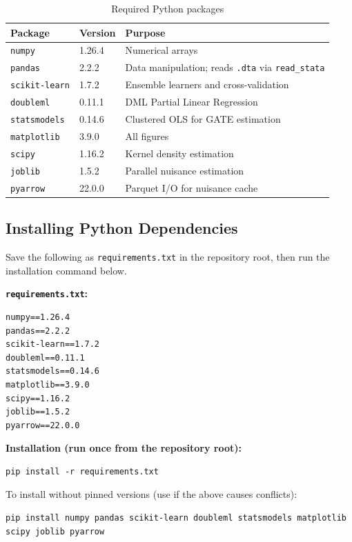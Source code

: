 \documentclass[11pt]{article}
\begin{document}
\begin{table}[h!]
\centering
\caption{Required Python packages}
\label{tab:python-packages}
\begin{tabular}{@{}lll@{}}
\toprule
Package & Version & Purpose \\
\midrule
\texttt{numpy}        & 1.26.4  & Numerical arrays \\
\texttt{pandas}       & 2.2.2   & Data manipulation; reads \texttt{.dta} via \texttt{read\_stata} \\
\texttt{scikit-learn} & 1.7.2   & Ensemble learners and cross-validation \\
\texttt{doubleml}     & 0.11.1  & DML Partial Linear Regression \\
\texttt{statsmodels}  & 0.14.6  & Clustered OLS for GATE estimation \\
\texttt{matplotlib}   & 3.9.0   & All figures \\
\texttt{scipy}        & 1.16.2  & Kernel density estimation \\
\texttt{joblib}       & 1.5.2   & Parallel nuisance estimation \\
\texttt{pyarrow}      & 22.0.0  & Parquet I/O for nuisance cache \\
\bottomrule
\end{tabular}
\end{table}

\subsection{Installing Python Dependencies}
\label{sec:python-install}

Save the following as \texttt{requirements.txt} in the repository root,
then run the installation command below.

\textbf{\texttt{requirements.txt}:}
\begin{lstlisting}
numpy==1.26.4
pandas==2.2.2
scikit-learn==1.7.2
doubleml==0.11.1
statsmodels==0.14.6
matplotlib==3.9.0
scipy==1.16.2
joblib==1.5.2
pyarrow==22.0.0
\end{lstlisting}

\textbf{Installation (run once from the repository root):}
\begin{lstlisting}
pip install -r requirements.txt
\end{lstlisting}

To install without pinned versions (use if the above causes conflicts):
\begin{lstlisting}
pip install numpy pandas scikit-learn doubleml statsmodels matplotlib scipy joblib pyarrow
\end{lstlisting}
\end{document}
